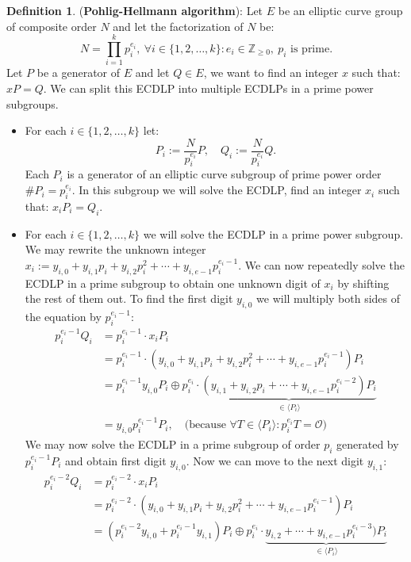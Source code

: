 \documentclass[thesis=M,english]{FITthesis}[2012/10/20]
\theoremstyle{remark}
\theoremstyle{definition}
\newtheorem{DF}{Definition}[section]
\begin{document}
\begin{DF}(\textbf{Pohlig-Hellmann algorithm}): Let $E$ be an elliptic curve group of composite order $N$ and let the factorization of $N$ be:
$$
N = \prod_{i=1}^kp_i^{e_i},\ \forall i \in \{1, 2, \ldots, k\}: e_i \in \mathbb{Z}_{\geq 0},\ p_i \text{ is prime}.
 $$ Let $P$ be a generator of $E$ and let $Q \in E$, we want to find an integer $x$ such that: $xP = Q$. We can split this ECDLP into multiple ECDLPs in a prime power subgroups. 
 \begin{itemize}
 \item For each $i \in \{1, 2, \ldots, k\}$ let:
 $$
 P_i := \frac{N}{p_i^{e_i}}P, \quad Q_i := \frac{N}{p_i^{e_i}}Q.
 $$ Each $P_i$ is a generator of an elliptic curve subgroup of prime power order  $\#P_i = p_i^{e_i}.$ In this subgroup we will solve the ECDLP, find an integer $x_i$  such that: $x_iP_i = Q_i.$
 \item  For each $i \in \{1, 2, \ldots, k\}$ we will solve the ECDLP in a prime power subgroup.  We may rewrite the unknown integer $x_i := y_{i,0} + y_{i,1}p_i + y_{i,2}p_i^2+ \cdots + y_{i,e-1}p_i^{e_i-1}.$ We can now repeatedly solve the ECDLP in a prime subgroup to obtain one unknown digit of $x_i$ by shifting the rest of them out. To find the first digit $y_{i,0}$ we will multiply both sides of the equation by $p_i^{e_i-1}$:
\begin{align*}
p_i^{e_i-1} Q_i &= p_i^{e_i-1}\cdot x_i  P_i\\ 
&= p_i^{e_i-1}\cdot (y_{i,0} + y_{i,1}p_i + y_{i,2}p_i^2+ \cdots + y_{i,e-1}p_i^{e_i-1})P_i \\
&= p_i^{e_i-1}y_{i,0}P_i \oplus p_i^{e_i}\cdot\underbrace{(y_{i,1} + y_{i,2}p_i+ \cdots + y_{i,e-1}p_i^{e_i-2})P_i}_{\in \langle P_i \rangle} \\
&= y_{i,0}p_i^{e_i-1}P_i, \quad \text{(because }\forall T \in \langle P_i \rangle : p_i^{e_i}T = \mathcal{O})
\end{align*}
We may now solve the ECDLP in a prime subgroup of order $p_i$ generated by $p_i^{e_i-1}P_i$ and obtain first digit $y_{i,0}.$ Now we can move to the next digit $y_{i,1}$:
\begin{align*}
p_i^{e_i-2} Q_i &= p_i^{e_i-2}\cdot x_i  P_i\\ 
&= p_i^{e_i-2}\cdot (y_{i,0} + y_{i,1}p_i + y_{i,2}p_i^2+ \cdots + y_{i,e-1}p_i^{e_i-1})P_i \\
&= (p_i^{e_i-2}y_{i,0} + p_i^{e_i-1}y_{i,1})P_i \oplus p_i^{e_i}\cdot\underbrace{y_{i,2}+ \cdots + y_{i,e-1}p_i^{e_i-3})P_i}_{\in \langle P_i \rangle} \\

\end{align*}
\end{itemize}
\end{DF}
\end{document}
